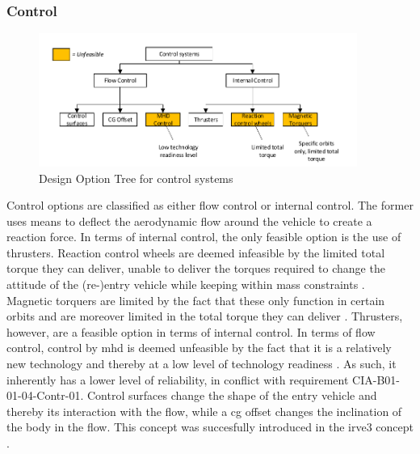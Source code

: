 \subsubsection{Control} \label{sec:DOTcontrol}
\begin{figure}[H]
\centering
\includegraphics[width = 0.93\textwidth]{Figure/DOT_control.pdf}
\vspace{-5mm}
\caption{Design Option Tree for control systems}
\label{fig:dotconfig}
\end{figure}
Control options are classified as either flow control or internal control. The former uses means to deflect the aerodynamic flow around the vehicle to create a reaction force. In terms of internal control, the only feasible option is the use of thrusters. Reaction control wheels are deemed infeasible by the limited total torque they can deliver, unable to deliver the torques required to change the attitude of the (re-)entry vehicle while keeping within mass constraints \cite{Wertz2011}. Magnetic torquers are limited by the fact that these only function in certain orbits and are moreover limited in the total torque they can deliver \cite{Wertz2011}. Thrusters, however, are a feasible option in terms of internal control. In terms of flow control, control by \gls{mhd} is deemed unfeasible by the fact that it is a relatively new technology and thereby at a low level of technology readiness \cite{Braun2009}. As such, it inherently has a lower level of reliability, in conflict with requirement CIA-B01-01-04-Contr-01. Control surfaces change the shape of the entry vehicle and thereby its interaction with the flow, while a \gls{cg} offset changes the inclination of the body in the flow. This concept was succesfully introduced in the \gls{irve3} concept \cite{Dillman2012}.



